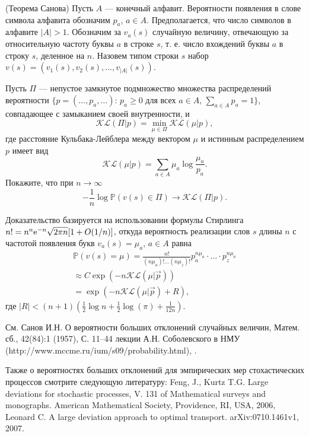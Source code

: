 \begin{problem}(Теорема Санова)
\label{sanov}
Пусть $A$ --- конечный алфавит. Вероятности появления в слове символа алфавита обозначим $p_a$, $a\in A$. Предполагается, что число символов в алфавите $|A|>1$. 
Обозначим за $v_a(s)$ случайную величину, отвечающую за относительную частоту буквы $a$ в строке $s$, т. е. число вхождений буквы $a$ в строку $s$, деленное на $n$. Назовем типом строки $s$ набор ${v}(s) = (v_1(s), v_2(s), . . . , v_{|A|}(s))$.

Пусть $\Pi$ --- непустое замкнутое подмножество множества распределений вероятности $\big\{{p}=(\dots,p_a,\dots):\, p_{a}\ge 0 \text{ для всех } a\in A,\, \sum_{a\in A}p_{a}=1\bigr\}$,  совпадающее с замыканием своей внутренности, и $$\mathcal{KL}(\Pi|{p}) = \min_{\mu\in\Pi}\mathcal{KL}(\mu|{p}),$$
где расстояние Кульбака-Лейблера между вектором $\mu$ и истинным распределением ${p}$ имеет вид
$$
\mathcal{KL}(\mu|{p}) = \sum_{a\in A} \mu_a\log\frac{\mu_a}{p_a}.
$$
Покажите, что при $n\to\infty$
$$
-\frac{1}{n}\log\mathbb{P}({v}(s)\in \Pi)\to\mathcal{KL}(\Pi|{p}).
$$

\end{problem}
\begin{remark}
Доказательство базируется на использовании формулы Стирлинга $n! = n^n{\rm e}^{-n}\sqrt{2\pi n}[1+O(1/n)]$, откуда вероятность реализации слов $s$ длины $n$ с частотой появления букв $v_a(s)=\mu_a$, $a \in A$ равна
\begin{equation*}
\begin{split}
\mathbb{P}(v(s)=\mu) = \frac{n!}{(n\mu_a)!\dots (n\mu_z)!}p_a^{n\mu_a}\cdot\dots\cdot p_z^{n\mu_a}\\
\approx C \exp(-n\mathcal{KL}(\mu|\vec{p}))\\
= \exp(-n\mathcal{KL}(\mu|\vec{p}) + R),
\end{split}
\end{equation*}
где $|R|<(n+1)(\frac 12 \log{n}+\frac 12 \log(\pi)+\frac{1}{12n}).$

См.  Санов И.Н. О вероятности больших отклонений случайных величин, Матем. сб., 42(84):1 (1957), С. 11–44 лекции А.Н. Соболевского в НМУ   (http://www.mccme.ru/ium/s09/probability.html), \cite{information}.

Также о вероятностях больших отклонений для эмпирических мер стохастических процессов смотрите следующую литературу: Feng, J., Kurtz T.G. Large deviations for stochastic processes, V. 131 of Mathematical surveys and monographs. American Mathematical Society, Providence, RI, USA, 2006, Leonard C. A large deviation approach to optimal transport. arXiv:0710.1461v1, 2007.


\end{remark}

